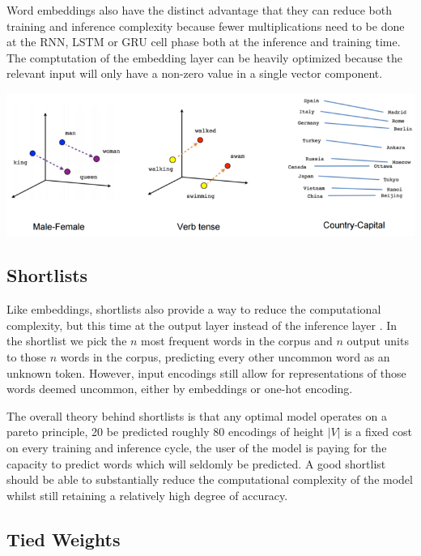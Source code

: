 \documentclass[a4paper]{article}
\begin{document}
Word embeddings also have the distinct advantage that they can reduce both training
and inference complexity because fewer multiplications need to be done at
the RNN, LSTM or GRU cell phase both at the inference and training time. The
comptutation of the embedding layer can be heavily optimized because the relevant
input will only have a non-zero value in a single vector component.

\includegraphics[width=\textwidth]{01}

\subsection{Shortlists}
\label{sec:shortlists}

Like embeddings, shortlists also provide a way to reduce the computational
complexity, but this time at the output layer instead of the inference layer
\cite{schwenk05}. In the shortlist we pick the $n$ most frequent words in the
corpus and $n$ output units to those $n$ words in the corpus, predicting every
other uncommon word as an unknown token. However, input encodings still
allow for representations of those words deemed uncommon, either by
embeddings or one-hot encoding.

The overall theory behind shortlists is that any optimal model operates
on a pareto principle, 20%
be predicted roughly 80%
encodings of height $|V|$ is a fixed cost on every training and inference
cycle, the user of the model is paying for the capacity to predict words which
will seldomly be predicted. A good shortlist should be able to substantially
reduce the computational complexity of the model whilst still retaining a
relatively high degree of accuracy.

\subsection{Tied Weights}
\label{sec:tiedweights}
\end{document}

